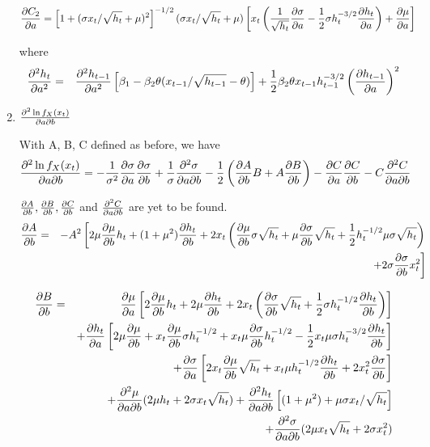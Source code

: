 \documentclass{book}
\begin{document}
\begin{enumerate}
  \begin{align*}
    \frac{\partial C_2}{\partial a} &= \left[1 + (\sigma x_t / \sqrt{h_t} +
      \mu)^2\right]^{-1/2}
    (\sigma x_t / \sqrt{h_t} + \mu) \left[ x_t \left(
        {1 \over \sqrt{h_t}} \frac{\partial \sigma}{\partial a}
        -{1 \over 2} \sigma h_t^{-3/2} \frac{\partial h_t}{\partial a} \right) + \frac{\partial \mu}{\partial a}
    \right]
  \end{align*}

  where
  \begin{eqnarray*}
    \frac{\partial^2 h_t}{\partial a^2} &=&
    \frac{\partial^2 h_{t-1}}{\partial a^2} \left[
      \beta_1 - \beta_2 \theta (x_{t-1}/\sqrt{h_{t-1}} - \theta)
    \right] + {1 \over 2} \beta_2 \theta x_{t-1} h_{t-1}^{-3/2}
    \left( \frac{\partial h_{t-1}}{\partial a} \right)^2
  \end{eqnarray*}
  

\item $\frac{\partial^2 \ln f_X(x_t)}{\partial a \partial b}$

  With A, B, C defined as before, we have
  \begin{align*}
    \frac{\partial^2 \ln f_X(x_t)}{\partial a \partial b} &=
    - {1 \over \sigma^2} \frac{\partial \sigma}{\partial a}\frac{\partial \sigma}{\partial b}
    + {1 \over \sigma} \frac{\partial^2 \sigma}{\partial a \partial b}
    - {1 \over 2} \left(
      \frac{\partial A}{\partial b}B + A\frac{\partial B}{\partial b}
    \right)
    - \frac{\partial C}{\partial a} \frac{\partial C}{\partial b}
    - C\frac{\partial^2 C}{\partial a \partial b}
  \end{align*}

  $\frac{\partial A}{\partial b}, \frac{\partial B}{\partial b}, \frac{\partial C}{\partial b}$ and $\frac{\partial^2 C}{\partial a \partial b}$ are yet to be
  found.
  \begin{eqnarray*}
    \frac{\partial A}{\partial b} &=& -A^2\left[
      2\mu \frac{\partial \mu}{\partial b} h_t + (1 + \mu^2) \frac{\partial h_t}{\partial b}
      + 2x_t \left(
        \frac{\partial \mu}{\partial b} \sigma \sqrt{h_t}
        + \mu \frac{\partial \sigma}{\partial b} \sqrt{h_t}
        + {1 \over 2} h_t^{-1/2} \mu\sigma \sqrt{h_t}
      \right) \right.\\
    &&
    \left. + 2 \sigma \frac{\partial \sigma}{\partial b} x_t^2
    \right]
  \end{eqnarray*}

  \begin{eqnarray*}
    \frac{\partial B}{\partial b} &=&
    \frac{\partial \mu}{\partial a} \left[
      2\frac{\partial \mu}{\partial b}h_t + 2\mu \frac{\partial h_t}{\partial b} + 2x_t\left(
        \frac{\partial \sigma}{\partial b} \sqrt{h_t} + {1 \over 2} \sigma h_t^{-1/2} \frac{\partial h_t}{\partial b}
      \right)
    \right] \\
    && + \frac{\partial h_t}{\partial a} \left[
      2\mu\frac{\partial \mu}{\partial b} + x_t \frac{\partial \mu}{\partial b} \sigma h_t^{-1/2} + x_t \mu
      \frac{\partial \sigma}{\partial b} h_t^{-1/2} -{1 \over 2} x_t \mu \sigma h_t^{-3/2} \frac{\partial h_t}{\partial b}
    \right] \\
    && + \frac{\partial \sigma}{\partial a} \left[
      2x_t\frac{\partial \mu}{\partial b} \sqrt{h_t} + x_t\mu h_t^{-1/2} \frac{\partial h_t}{\partial b} +
      2 x_t^2 \frac{\partial \sigma}{\partial b}
    \right] \\
    && + \frac{\partial^2 \mu}{\partial a \partial b}(2\mu h_t + 2\sigma x_t \sqrt{h_t})
    + \frac{\partial^2 h_t}{\partial a \partial b} \left[
      (1 + \mu^2) + \mu\sigma x_t / \sqrt{h_t}
    \right] \\
    && + \frac{\partial^2 \sigma}{\partial a \partial b} (2\mu x_t \sqrt{h_t} + 2\sigma x_t^2)
  \end{eqnarray*}


\end{enumerate}
\end{document}
